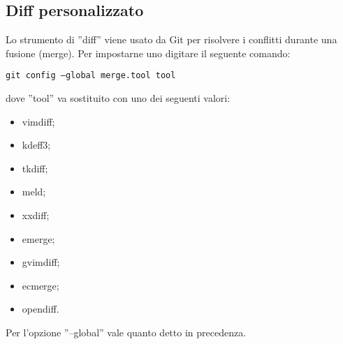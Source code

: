 \subsection{Diff personalizzato}
Lo strumento di ''diff'' viene usato da Git per risolvere i conflitti durante una fusione (merge). Per impostarne uno digitare il seguente comando:

\begin{center}
\texttt{git config --global merge.tool tool}
\end{center}

dove ''tool'' va sostituito con uno dei seguenti valori:

\begin{itemize}
\item vimdiff;
\item kdeff3;
\item tkdiff;
\item meld;
\item xxdiff;
\item emerge;
\item gvimdiff;
\item ecmerge;
\item opendiff.
\end{itemize}

Per l'opzione ''--global'' vale quanto detto in precedenza.